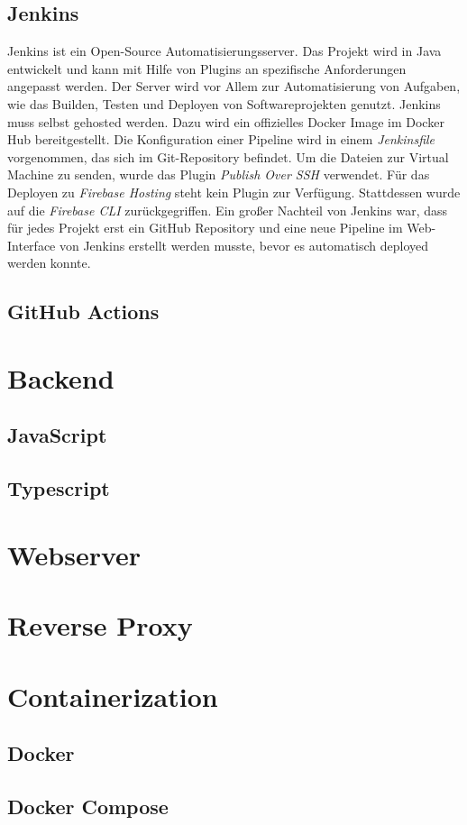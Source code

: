 \subsection{Jenkins}
Jenkins ist ein Open-Source Automatisierungsserver. Das Projekt wird in
Java entwickelt und kann mit Hilfe von Plugins an spezifische Anforderungen
angepasst werden.
Der Server wird vor Allem zur Automatisierung von Aufgaben, wie das Builden,
Testen und Deployen von Softwareprojekten genutzt.
Jenkins muss selbst gehosted werden. Dazu wird ein offizielles Docker Image
im Docker Hub bereitgestellt.
Die Konfiguration einer Pipeline wird in einem \textit{Jenkinsfile} vorgenommen,
das sich im Git-Repository befindet.
Um die Dateien zur Virtual Machine zu senden, wurde das Plugin \textit{Publish Over SSH}
verwendet. Für das Deployen zu \textit{Firebase Hosting} steht kein Plugin zur
Verfügung. Stattdessen wurde auf die \textit{Firebase CLI} zurückgegriffen.
Ein großer Nachteil von Jenkins war, dass für jedes Projekt erst ein GitHub
Repository und eine neue Pipeline im Web-Interface von Jenkins erstellt werden
musste, bevor es automatisch deployed werden konnte.


\subsection{GitHub Actions}

\section{Backend}
\subsection{JavaScript}
\subsection{Typescript}

\section{Webserver}

\section{Reverse Proxy}

\section{Containerization}
\subsection{Docker}
\subsection{Docker Compose}